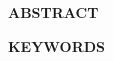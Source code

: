 \newpage
\thispagestyle{empty}
\begin{center}
    \textbf{ABSTRACT}
\end{center}

\begin{center}
    \textbf{KEYWORDS}
\end{center}

